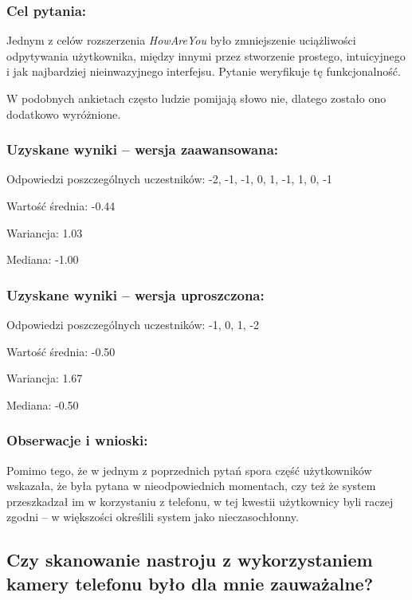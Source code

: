 	\subsubsection{Cel pytania:}
	
	Jednym z celów rozszerzenia \textit{HowAreYou} było zmniejszenie uciążliwości odpytywania użytkownika, między innymi przez stworzenie prostego, intuicyjnego i jak najbardziej nieinwazyjnego interfejsu. Pytanie weryfikuje tę funkcjonalność.
	
	W podobnych ankietach często ludzie pomijają słowo nie, dlatego zostało ono dodatkowo wyróżnione.
	
	\subsubsection{Uzyskane wyniki -- wersja zaawansowana:}
	
	Odpowiedzi poszczególnych uczestników: -2, -1, -1, 0, 1, -1, 1, 0, -1
	
	Wartość średnia: -0.44
	
	Wariancja: 1.03
	
	Mediana: -1.00
	
	\subsubsection{Uzyskane wyniki -- wersja uproszczona:}
	
	Odpowiedzi poszczególnych uczestników: -1, 0, 1, -2
	
	Wartość średnia: -0.50
	
	Wariancja: 1.67
	
	Mediana: -0.50
	
	\subsubsection{Obserwacje i wnioski:}
	
	Pomimo tego, że w jednym z poprzednich pytań spora część użytkowników wskazała, że była pytana w nieodpowiednich momentach, czy też że system przeszkadzał im w korzystaniu z telefonu, w tej kwestii użytkownicy byli raczej zgodni -- w większości określili system jako nieczasochłonny.
	
	
	
\subsection{Czy skanowanie nastroju z wykorzystaniem kamery telefonu było dla mnie zauważalne?}
	
